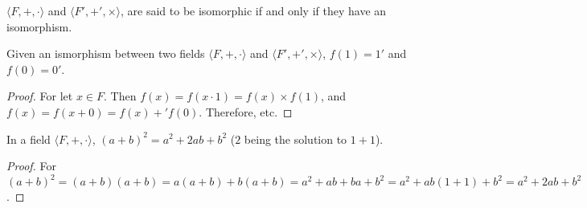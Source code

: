 \documentclass[crop=false,class=article,oneside]{standalone}
\begin{document}
        \begin{definition}
        $\langle F,+,\cdot \rangle$ and $\langle F', +',\times \rangle$, are said to be isomorphic if and only if they have an isomorphism.
        \end{definition}
        \begin{theorem}
        Given an ismorphism between two fields $\langle F,+,\cdot \rangle$ and $\langle F', +',\times \rangle$, $f(1) = 1'$ and $f(0) = 0'$.
        \end{theorem}
        \begin{proof}
        For let $x\in F$. Then $f(x)=f(x\cdot 1) = f(x)\times f(1)$, and $f(x)=f(x+0) = f(x)+'f(0)$. Therefore, etc.
        \end{proof}
        \begin{theorem}
        In a field $\langle F,+,\cdot \rangle$, $(a+ b)^2 = a^2 + 2ab + b^2$ ($2$ being the solution to $1+1$).
        \end{theorem}
        \begin{proof}
        For $(a+b)^2 = (a+b)(a+b) = a(a+b)+b(a+b) = a^2 + ab + ba + b^2 = a^2 +ab(1+1)+b^2 = a^2 + 2ab + b^2$.
        \end{proof}
\end{document}
